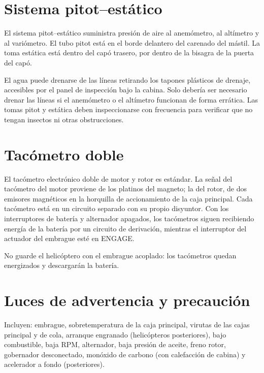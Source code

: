\section{Sistema pitot--estático}

El sistema pitot--estático suministra presión de aire al anemómetro, al altímetro y al variómetro. El tubo pitot está en el borde delantero del carenado del mástil. La toma estática está dentro del capó trasero, por dentro de la bisagra de la puerta del capó.

El agua puede drenarse de las líneas retirando los tapones plásticos de drenaje, accesibles por el panel de inspección bajo la cabina. Solo debería ser necesario drenar las líneas si el anemómetro o el altímetro funcionan de forma errática. Las tomas pitot y estática deben inspeccionarse con frecuencia para verificar que no tengan insectos ni otras obstrucciones.

\section{Tacómetro doble}

El tacómetro electrónico doble de motor y rotor es estándar. La señal del tacómetro del motor proviene de los platinos del magneto; la del rotor, de dos emisores magnéticos en la horquilla de accionamiento de la caja principal. Cada tacómetro está en un circuito separado con su propio disyuntor. Con los interruptores de batería y alternador apagados, los tacómetros siguen recibiendo energía de la batería por un circuito de derivación, mientras el interruptor del actuador del embrague esté en \textsf{ENGAGE}.

\begin{nota}
No guarde el helicóptero con el embrague acoplado: los tacómetros quedan energizados y descargarán la batería.
\end{nota}

\section{Luces de advertencia y precaución}

Incluyen: embrague, sobretemperatura de la caja principal, virutas de las cajas principal y de cola, arranque engranado (helicópteros posteriores), bajo combustible, baja RPM, alternador, baja presión de aceite, freno rotor, gobernador desconectado, monóxido de carbono (con calefacción de cabina) y acelerador a fondo (posteriores).

